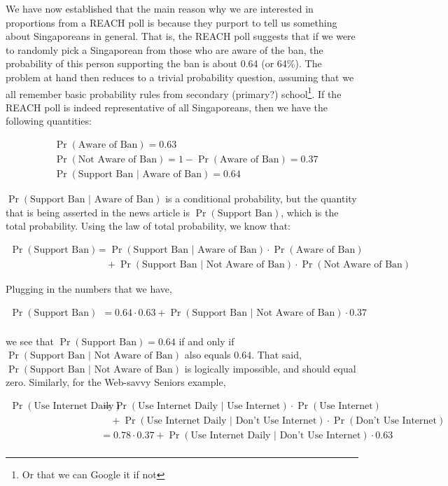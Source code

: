 \documentclass[openany]{book}
\let\rmarkdownfootnote\footnote%
\def\footnote{\protect\rmarkdownfootnote}
\begin{document}
We have now established that the main reason why we are interested in
proportions from a REACH poll is because they purport to tell us
something about Singaporeans in general. That is, the REACH poll
suggests that if we were to randomly pick a Singaporean from those who
are aware of the ban, the probability of this person supporting the ban
is about 0.64 (or 64\%). The problem at hand then reduces to a trivial
probability question, assuming that we all remember basic probability
rules from secondary (primary?) school\footnote{Or that we can Google it
  if not}. If the REACH poll is indeed representative of all
Singaporeans, then we have the following quantities:

 \[
\begin{aligned}
&\Pr(\text{Aware of Ban}) = 0.63 \\
&\Pr(\text{Not Aware of Ban}) = 1 - \Pr(\text{Aware of Ban}) = 0.37 \\
&\Pr(\text{Support Ban } | \text{ Aware of Ban}) = 0.64 
\end{aligned}
\]

\(\Pr(\text{Support Ban } | \text{ Aware of Ban})\) is a conditional
probability, but the quantity that is being asserted in the news article
is \(\Pr(\text{Support Ban})\), which is the total probability. Using
the law of total probability, we know that:

 \[
\begin{aligned}
\Pr(\text{Support Ban}) &= \Pr(\text{Support Ban } | \text{ Aware of Ban})\cdot \Pr(\text{Aware of Ban}) \\
& \quad + \Pr(\text{Support Ban } | \text{ Not Aware of Ban})\cdot \Pr(\text{Not Aware of Ban}) 
\end{aligned}
\]

Plugging in the numbers that we have,

 \[
\begin{aligned}
\Pr(\text{Support Ban}) &= 0.64 \cdot 0.63 + \Pr(\text{Support Ban } | \text{ Not Aware of Ban}) \cdot 0.37 \\
\end{aligned}
\]

we see that \(\Pr(\text{Support Ban}) = 0.64\) if and only if
\(\Pr(\text{Support Ban } | \text{ Not Aware of Ban})\) also equals
\(0.64\). That said,
\(\Pr(\text{Support Ban } | \text{ Not Aware of Ban})\) is logically
impossible, and should equal zero. Similarly, for the Web-savvy Seniors
example,

 \[
\begin{aligned}
\Pr(\text{Use Internet Daily}) &= \Pr(\text{Use Internet Daily } | \text{ Use Internet})\cdot \Pr(\text{Use Internet}) \\
& \quad + \Pr(\text{Use Internet Daily } | \text{ Don't Use Internet})\cdot \Pr(\text{Don't Use Internet}) \\
&= 0.78 \cdot 0.37 + \Pr(\text{Use Internet Daily } | \text{ Don't Use Internet})\cdot 0.63 \\
\end{aligned}
\]
\end{document}
